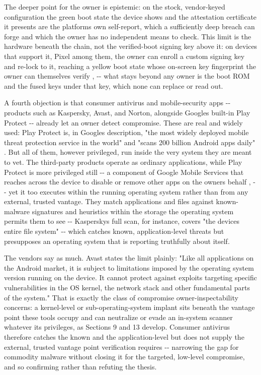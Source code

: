 \documentclass[
]{article}
\begin{document}
The deeper point for the owner is epistemic: on the stock, vendor-keyed
configuration the green boot state the device shows and the attestation
certificate it presents are the platform\textquotesingle s own
self-report, which a sufficiently deep breach can forge and which the
owner has no independent means to check. This limit is the hardware
beneath the chain, not the verified-boot signing key above it: on
devices that support it, Pixel among them, the owner can enroll a custom
signing key and re-lock to it, reaching a yellow boot state whose
on-screen key fingerprint the owner can themselves verify
\citep{aosp-boot-flow}, \citep{aosp-device-state} -\/- what stays beyond
any owner is the boot ROM and the fused keys under that key, which none
can replace or read out.

A fourth objection is that consumer antivirus and mobile-security apps
-\/- products such as Kaspersky, Avast, and Norton, alongside
Google\textquotesingle s built-in Play Protect -\/- already let an owner
detect compromise. These are real and widely used: Play Protect is, in
Google\textquotesingle s description, "the most widely deployed mobile
threat protection service in the world" and "scans 200 billion Android
apps daily" \citep{google-play-protect}. But all of them, however
privileged, run inside the very system they are meant to vet. The
third-party products operate as ordinary applications, while Play
Protect is more privileged still -\/- a component of Google Mobile
Services that reaches across the device to disable or remove other apps
on the owner\textquotesingle s behalf
\citep{google-play-protect-remove}, \citep{google-gms} -\/- yet it too
executes within the running operating system rather than from any
external, trusted vantage. They match applications and files against
known-malware signatures and heuristics within the storage the operating
system permits them to see -\/- Kaspersky\textquotesingle s full scan,
for instance, covers "the device\textquotesingle s entire file system"
\citep{kaspersky-android} -\/- which catches known, application-level
threats but presupposes an operating system that is reporting truthfully
about itself.

The vendors say as much. Avast states the limit plainly: "Like all
applications on the Android market, it is subject to limitations imposed
by the operating system version running on the device. It cannot protect
against exploits targeting specific vulnerabilities in the OS kernel,
the network stack and other fundamental parts of the system."
\citep{avast-mobile-faq} That is exactly the class of compromise
owner-inspectability concerns: a kernel-level or sub-operating-system
implant sits beneath the vantage point these tools occupy and can
neutralize or evade an in-system scanner whatever its privileges, as
Sections 9 and 13 develop. Consumer antivirus therefore catches the
known and the application-level but does not supply the external,
trusted vantage point verification requires -\/- narrowing the gap for
commodity malware without closing it for the targeted, low-level
compromise, and so confirming rather than refuting the thesis.
\end{document}

